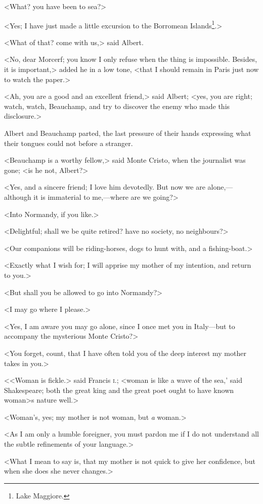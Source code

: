  <What? you have been to sea?> 

 <Yes; I have just made a little excursion to the Borromean Islands\footnote{Lake Maggiore. }.> 

 <What of that? come with us,> said Albert. 

 <No, dear Morcerf; you know I only refuse when the thing is impossible. Besides, it is important,> added he in a low tone, <that I should remain in Paris just now to watch the paper.> 

 <Ah, you are a good and an excellent friend,> said Albert; <yes, you are right; watch, watch, Beauchamp, and try to discover the enemy who made this disclosure.> 

 Albert and Beauchamp parted, the last pressure of their hands expressing what their tongues could not before a stranger. 

 <Beauchamp is a worthy fellow,> said Monte Cristo, when the journalist was gone; <is he not, Albert?> 

 <Yes, and a sincere friend; I love him devotedly. But now we are alone,—although it is immaterial to me,—where are we going?> 

 <Into Normandy, if you like.> 

 <Delightful; shall we be quite retired? have no society, no neighbours?> 

 <Our companions will be riding-horses, dogs to hunt with, and a fishing-boat.> 

 <Exactly what I wish for; I will apprise my mother of my intention, and return to you.> 

 <But shall you be allowed to go into Normandy?> 

 <I may go where I please.> 

 <Yes, I am aware you may go alone, since I once met you in Italy—but to accompany the mysterious Monte Cristo?> 

 <You forget, count, that I have often told you of the deep interest my mother takes in you.> 

 <<Woman is fickle.> said Francis \textsc{i.}; <woman is like a wave of the sea,' said Shakespeare; both the great king and the great poet ought to have known woman>s nature well.> 

 <Woman's, yes; my mother is not woman, but \textit{a} woman.> 

 <As I am only a humble foreigner, you must pardon me if I do not understand all the subtle refinements of your language.> 

 <What I mean to say is, that my mother is not quick to give her confidence, but when she does she never changes.> 

